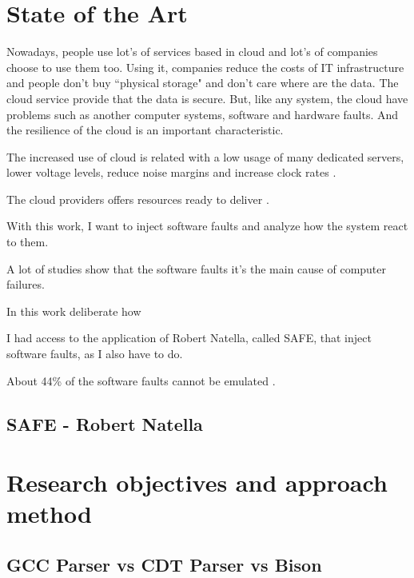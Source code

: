 \newpage
\section{State of the Art}

Nowadays, people use lot's of services based in cloud and lot's of companies choose to use them too. Using it, companies reduce the costs of IT infrastructure and people don't buy ``physical storage" and don't care where are the data. The cloud service provide that the data is secure.
But, like any system, the cloud have problems such as another computer systems, software and hardware faults. And the resilience of the cloud is an important characteristic.

The increased use of cloud is related with a low usage of many dedicated servers, lower voltage levels, reduce noise margins and increase clock rates \cite{wolter2012resilience}.

The cloud providers offers resources ready to deliver \cite{wolter2012resilience}.

With this work, I want to inject software faults and analyze how the system react to them.

A lot of studies show that the software faults it's the main cause of computer failures.

In this work
deliberate how

I had access to the application of Robert Natella, called SAFE, that inject software faults, as I also have to do.

\cite{duraes2006emulation}
\cite{avizzienisbasic}

About 44\% of the software faults cannot be emulated \cite{madeira2000emulation}.

\subsection{SAFE - Robert Natella}



\newpage
\section{Research objectives and approach method}

\subsection{GCC Parser vs CDT Parser vs Bison}


